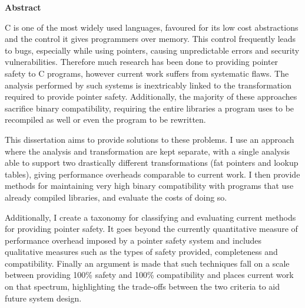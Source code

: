 \documentclass[a4paper,12pt,twoside,openright]{report}
\begin{document}
\pagestyle{empty}
\singlespacing

\onehalfspacing

\singlespacing
\newpage
{\Huge \bf Abstract}
\vspace{24pt} 

C is one of the most widely used languages, favoured for its low cost abstractions and the control it gives programmers over memory.
This control frequently leads to bugs, especially while using pointers, causing unpredictable errors and security vulnerabilities.
Therefore much research has been done to providing pointer safety to C programs, however current work suffers from systematic flaws.
The analysis performed by such systems is inextricably linked to the transformation required to provide pointer safety.
Additionally, the majority of these approaches sacrifice binary compatibility, requiring the entire libraries a program uses to be recompiled as well or even the program to be rewritten.

This dissertation aims to provide solutions to these problems.
I use an approach where the analysis and transformation are kept separate, with a single analysis able to support two drastically different transformations (fat pointers and lookup tables), giving performance overheads comparable to current work.
I then provide methods for maintaining very high binary compatibility with programs that use already compiled libraries, and evaluate the costs of doing so.

Additionally, I create a taxonomy for classifying and evaluating current methods for providing pointer safety.
It goes beyond the currently quantitative measure of performance overhead imposed by a pointer safety system and includes qualitative measures such as the types of safety provided, completeness and compatibility.
Finally an argument is made that such techniques fall on a scale between providing 100\% safety and 100\% compatibility and places current work on that spectrum, highlighting the trade-offs between the two criteria to aid future system design.

\newpage
\vspace*{\fill}

\setcounter{page}{0}
\pagestyle{plain}
\tableofcontents
\listoffigures
\listoftables
\end{document}
